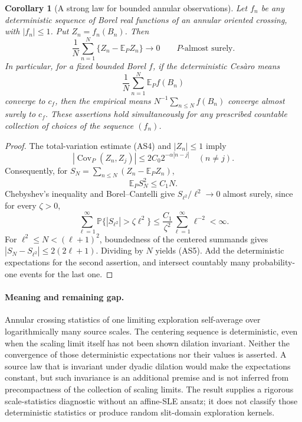 \documentclass[11pt]{article}
\newtheorem{corollary}[theorem]{Corollary}
\theoremstyle{definition}\newtheorem{definition}[theorem]{Definition}
\theoremstyle{remark}\newtheorem{remark}[theorem]{Remark}
\begin{document}
\begin{corollary}[A strong law for bounded annular observations]
\label{cor:scenery-slln}
Let $f_n$ be any deterministic sequence of Borel real functions of an
annular oriented crossing, with $|f_n|\le1$. Put
$Z_n=f_n(B_n)$. Then
\[
 \frac1N\sum_{n=1}^N\{Z_n-\mathbb E_P Z_n\}
          \longrightarrow0\qquad P\text{-almost surely}.
 \tag{AS5}
\]
In particular, for a fixed bounded Borel $f$, if the deterministic
Ces\`aro means
\[
 \frac1N\sum_{n=1}^N\mathbb E_P f(B_n)
\]
converge to $c_f$, then the empirical means
$N^{-1}\sum_{n\le N}f(B_n)$ converge almost surely to $c_f$.
These assertions hold simultaneously for any prescribed countable
collection of choices of the sequence $(f_n)$.
\end{corollary}
\begin{proof}
The total-variation estimate (AS4) and $|Z_n|\le1$ imply
\[
 |\operatorname{Cov}_P(Z_n,Z_j)|
       \le2C_0 2^{-\alpha|n-j|}\quad(n\ne j).
\]
Consequently, for $S_N=\sum_{n\le N}(Z_n-\mathbb E_P Z_n)$,
\[
 \mathbb E_P S_N^2\le C_1 N.
\]
Chebyshev's inequality and Borel--Cantelli give
$S_{\ell^2}/\ell^2\to0$ almost surely, since for every $\zeta>0$,
\[
 \sum_{\ell=1}^{\infty}
 \mathbb P\{|S_{\ell^2}|>\zeta\ell^2\}
 \le\frac{C_1}{\zeta^2}
                  \sum_{\ell=1}^{\infty}\ell^{-2}<\infty.
\]
For $\ell^2\le N<(\ell+1)^2$, boundedness of the centered summands
gives
$|S_N-S_{\ell^2}|\le2(2\ell+1)$. Dividing by $N$ yields (AS5).
Add the deterministic expectations for the second assertion, and
intersect countably many probability-one events for the last one.
\end{proof}

\paragraph{Meaning and remaining gap.}
Annular crossing statistics of one limiting exploration self-average
over logarithmically many source scales. The centering sequence is
deterministic, even when the scaling limit itself has not been shown
dilation invariant. Neither the convergence of those deterministic
expectations nor their values is asserted. A source law that is
invariant under dyadic dilation would make the expectations constant,
but such invariance is an additional premise and is not inferred from
precompactness of the collection of scaling limits. The result supplies
a rigorous scale-statistics diagnostic without an affine-SLE ansatz;
it does not classify those deterministic statistics or produce random
slit-domain exploration kernels.
\end{document}
